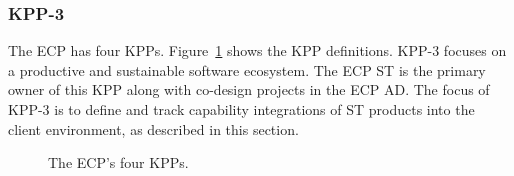 \subsubsection{KPP-3}

The ECP has four KPPs.  Figure~\ref{fig:kpp-definitions} shows the KPP definitions. KPP-3 focuses on a productive and sustainable software ecosystem. The ECP ST is the primary owner of this KPP along with co-design projects in the ECP AD.  The focus of KPP-3 is to define and track capability integrations of ST products into the client environment, as described in this section. 

\begin{figure}
	\centering
	\caption{The ECP's four KPPs.}
	\label{fig:kpp-definitions}
\end{figure}



